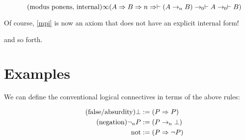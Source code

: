 \documentclass{article}
\begin{document}
  \begin{equation*}
    \tag{modus ponens, internal}\label{mpi}
    \infty 
      (A \Rightarrow B \Rightarrow n \Rightarrow \vdash (A \rightarrow_{\hspace{-0.04em}n} B) \rightarrow_{\hspace{-0.04em}0} \vdash A \rightarrow_{\hspace{-0.04em}0} \vdash B)
   \\
  \end{equation*}

  Of course, \eqref{mpi} is now an axiom that does not have an explicit internal form!


  and so forth.

  \section{Examples}\label{structure}

  We can define the conventional logical connectives in terms of the above rules:

  \setlength{\jot}{0.4em}
  \begin{align*}
    \tag{false/absurdity}
    \bot &:= (P \Rightarrow{P})\\
    \tag{negation}
    \neg_{n} P &:= ({P \rightarrow_{\hspace{-0.04em}n} \bot})\\
    \mathrm{not} &:= (P \Rightarrow \neg P)\\
  \end{align*}
\end{document}
